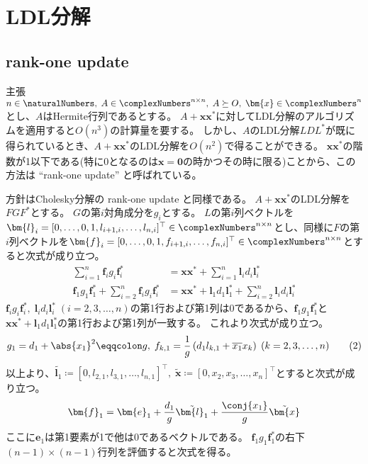 \chapter{LDL分解}
    \section{rank-one update}
        \begin{itembox}[l]{主張}
            $n\in\naturalNumbers,\;A\in\complexNumbers^{n\times n},\;A\succeq O,\;\bm{x}\in\complexNumbers^n$とし、$A$はHermite行列であるとする。
            $A+\bm{x}\bm{x}^*$に対してLDL分解のアルゴリズムを適用すると$O(n^3)$の計算量を要する。
            しかし、$A$のLDL分解$LDL^*$が既に得られているとき、$A+\bm{x}\bm{x}^*$のLDL分解を$O(n^2)$で得ることができる。
            $\bm{x}\bm{x}^*$の階数が1以下である(特に0となるのは$\bm{x}=\bm{0}$の時かつその時に限る)ことから、この方法は ``rank-one update'' と呼ばれている。
        \end{itembox}
        \begin{derivation*}
            方針はCholesky分解の rank-one update と同様である。
            $A+\bm{x}\bm{x}^*$のLDL分解を$FGF^*$とする。
            $G$の第$i$対角成分を$g_i$とする。
            $L$の第$i$列ベクトルを$\bm{l}_i = [0,\dots,0,1,l_{i+1,i},\dots,l_{n,i}]^\top\in\complexNumbers^{n\times n}$とし、同様に$F$の第$i$列ベクトルを$\bm{f}_i = [0,\dots,0,1,f_{i+1,i},\dots,f_{n,i}]^\top\in\complexNumbers^{n\times n}$とすると次式が成り立つ。
            \begin{align*}
                \sum_{i=1}^n \bm{f}_i g_i\bm{f}_i^* &= \bm{x}\bm{x}^* + \sum_{i=1}^n \bm{l}_i d_i\bm{l}_i^* \\
                \bm{f}_1 g_1\bm{f}_1^* + \sum_{i=2}^n \bm{f}_i g_i\bm{f}_i^* &= \bm{x}\bm{x}^* + \bm{l}_1 d_1\bm{l}_1^* + \sum_{i=2}^n \bm{l}_i d_i\bm{l}_i^* \tag{1}
            \end{align*}
            $\bm{f}_i g_i\bm{f}_i^*,\;\bm{l}_i d_i\bm{l}_i^*\;(i=2,3,\dots,n)$の第1行および第1列は0であるから、$\bm{f}_1 g_1\bm{f}_1^*$と$\bm{x}\bm{x}^* + \bm{l}_1 d_1\bm{l}_1^*$の第1行および第1列が一致する。
            これより次式が成り立つ。
            \[ g_1 = d_1 + \abs{x_1}^2 \eqqcolon g,\; f_{k,1} = \frac{1}{g}\left(d_1 l_{k,1} + \overline{x_1}x_k\right) \; (k=2,3,\dots,n) \tag{2} \]
            以上より、$\tilde{\bm{l}_1} \coloneqq [0,l_{2,1},l_{3,1},\dots,l_{n,1}]^\top,\;\tilde{\bm{x}} \coloneqq [0,x_2,x_3,\dots,x_n]^\top$とすると次式が成り立つ。
            \[ \bm{f}_1 = \bm{e}_1 + \frac{d_1}{g}\tilde{\bm{l}_1} + \frac{\conj{x_1}}{g}\tilde{\bm{x}} \]
            ここに$\bm{e}_1$は第1要素が1で他は0であるベクトルである。
            $\bm{f}_1 g_1\bm{f}_1^*$の右下$(n-1)\times(n-1)$行列を評価すると次式を得る。
        \end{derivation*}
